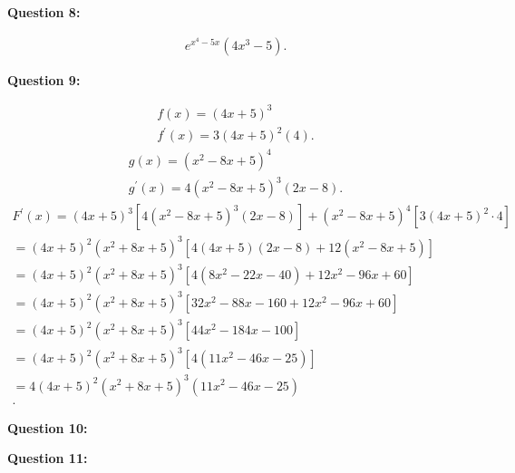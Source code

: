 \documentclass{report}
\begin{document}
    \bigbreak \noindent \bigbreak \noindent 
    \begin{Large}
        \textbf{Question 8:}
    \end{Large}
    \bigbreak \noindent 
    \bigbreak \noindent 
    \begin{align*}
        e^{x^{4}-5x}(4x^{3}-5)
    .\end{align*}

    \bigbreak \noindent \bigbreak \noindent 
    \begin{Large}
        \textbf{Question 9:}
    \end{Large}
    \bigbreak \noindent 
    \bigbreak \noindent 
    \begin{align*}
        f(x) = (4x+5)^{3} \\
        f^{\prime}(x) = 3(4x+5)^{2}(4)
    .\end{align*}
    \begin{align*}
        g(x) = (x^{2}-8x+5)^{4} \\
        g^{\prime}(x) = 4(x^{2}-8x+5)^{3}(2x-8)
    .\end{align*}
    \begin{align*}
        F^{\prime}(x) = (4x+5)^{3}[4(x^{2}-8x+5)^{3}(2x-8)]+(x^{2}-8x+5)^{4}[3(4x+5)^{2}\cdot 4] \\
        = (4x+5)^{2}(x^{2}+8x+5)^{3}[4(4x+5)(2x-8)+12(x^{2}-8x+5)]\\
        = (4x+5)^{2}(x^{2}+8x+5)^{3}[4(8x^2-22x-40)+12x^{2}-96x+60]\\
        = (4x+5)^{2}(x^{2}+8x+5)^{3}[32x^2-88x-160+12x^{2}-96x+60]\\
        = (4x+5)^{2}(x^{2}+8x+5)^{3}[44x^{2}-184x-100]\\
        = (4x+5)^{2}(x^{2}+8x+5)^{3}[4(11x^{2}-46x-25)]\\
        = 4(4x+5)^{2}(x^{2}+8x+5)^{3}(11x^{2}-46x-25)\\
    .\end{align*}


    \bigbreak \noindent \bigbreak \noindent 
    \begin{Large}
        \textbf{Question 10:}
    \end{Large}
    \bigbreak \noindent 
    \bigbreak \noindent 

    \bigbreak \noindent \bigbreak \noindent 
    \begin{Large}
        \textbf{Question 11:}
    \end{Large}
    \bigbreak \noindent 
    \bigbreak \noindent 
\end{document}
